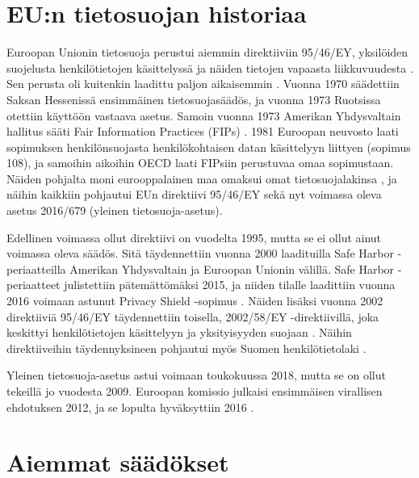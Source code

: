\documentclass[finnish]{tktltiki}
\begin{document}
\section{EU:n tietosuojan historiaa}

Euroopan Unionin tietosuoja perustui aiemmin direktiiviin 95/46/EY, yksilöiden suojelusta henkilötietojen käsittelyssä ja näiden tietojen vapaasta liikkuvuudesta \cite{eu95}. Sen perusta oli kuitenkin laadittu paljon aikaisemmin \cite{tikkinen}. Vuonna 1970 säädettiin Saksan Hessenissä ensimmäinen tietosuojasäädös, ja vuonna 1973 Ruotsissa otettiin käyttöön vastaava asetus. Samoin vuonna 1973 Amerikan Yhdysvaltain hallitus sääti Fair Information Practices (FIPs) \cite{tikkinen}. 1981 Euroopan neuvosto laati sopimuksen henkilönsuojasta henkilökohtaisen datan käsittelyyn liittyen (sopimus 108), ja samoihin aikoihin OECD laati FIPsiin perustuvaa omaa sopimustaan. Näiden pohjalta moni eurooppalainen maa omaksui omat tietosuojalakinsa \cite{tikkinen}, ja näihin kaikkiin pohjautui EUn direktiivi 95/46/EY sekä nyt voimassa oleva asetus 2016/679 (yleinen tietosuoja-asetus). 

Edellinen voimassa ollut direktiivi on vuodelta 1995, mutta se ei ollut ainut voimassa oleva säädös. Sitä täydennettiin vuonna 2000 laadituilla Safe Harbor -periaatteilla Amerikan Yhdysvaltain ja Euroopan Unionin välillä. Safe Harbor -periaatteet julistettiin pätemättömäksi 2015, ja niiden tilalle laadittiin vuonna 2016 voimaan astunut Privacy Shield -sopimus \cite{privacy,tikkinen}. Näiden lisäksi vuonna 2002 direktiiviä 95/46/EY täydennettiin toisella, 2002/58/EY -direktiivillä, joka keskittyi henkilötietojen käsittelyyn ja yksityisyyden suojaan \cite{eu2002,tikkinen}. Näihin direktiiveihin täydennyksineen pohjautui myös Suomen henkilötietolaki \cite{henkilotieto}.

Yleinen tietosuoja-asetus astui voimaan toukokuussa 2018, mutta se on ollut tekeillä jo vuodesta 2009. Euroopan komissio julkaisi ensimmäisen virallisen ehdotuksen 2012, ja se lopulta hyväksyttiin 2016 \cite{eu2016,tikkinen}.


\newpage
\section{Aiemmat säädökset}
\end{document}
